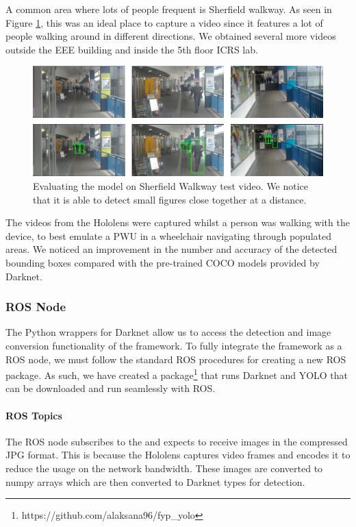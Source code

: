 A common area where lots of people frequent is Sherfield walkway. As seen in Figure \ref{fig:yoloSherfield}, this was an ideal place to capture a video since it features a lot of people walking around in different directions. We obtained several more videos outside the EEE building and inside the 5th floor ICRS lab.

\begin{figure}[ht]
    \centering
    \includegraphics[width=0.95\linewidth]{img/chapter5_implementation/yoloWalkwayMultiple.png}
    \caption{Evaluating the model on Sherfield Walkway test video. We notice that it is able to detect small figures close together at a distance.}
    \label{fig:yoloSherfield}
\end{figure}

The videos from the Hololens were captured whilst a person was walking with the device, to best emulate a PWU in a wheelchair navigating through populated areas. We noticed an improvement in the number and accuracy of the detected bounding boxes compared with the pre-trained COCO models provided by Darknet. 

\subsubsection{ROS Node} \label{sec:nodeYOLO}
The Python wrappers for Darknet allow us to access the detection and image conversion functionality of the framework. To fully integrate the framework as a ROS node, we must follow the standard ROS procedures for creating a new ROS package. As such, we have created a package\footnote{https://github.com/alaksana96/fyp\_yolo} that runs Darknet and YOLO that can be downloaded and run seamlessly with ROS.

\paragraph{ROS Topics} The ROS node subscribes to the  and expects to receive images in the compressed JPG format. This is because the Hololens captures video frames and encodes it to reduce the usage on the network bandwidth. These images are converted to numpy arrays which are then converted to Darknet  types for detection. 

